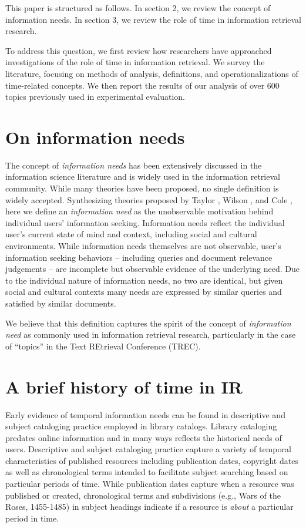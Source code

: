 \documentclass{sig-alternate}
\begin{document}
This paper is structured as follows.  In section 2, we review the concept of information needs. In section 3, we review the role of time in information retrieval research. 


To address this question, we first review how researchers have approached investigations of the role of time in information retrieval. We survey the literature, focusing on methods of analysis, definitions, and operationalizations of time-related concepts. We then report the results of our analysis of over 600 topics previously used in experimental evaluation. 


\section{On information needs}

The concept of \emph{information needs} has been extensively discussed in the information science literature and is widely used in the information retrieval community. While many theories have been proposed, no single definition is widely accepted.  Synthesizing theories proposed by Taylor \cite{Taylor}, Wilson \cite{Wilson}, and Cole \cite{Cole}, here we define an \emph{information need} as the unobservable motivation behind individual users' information seeking. Information needs reflect the individual user's current state of mind and context, including social and cultural environments. While information needs themselves are not observable, user's information seeking behaviors -- including queries and document relevance judgements -- are incomplete but observable evidence of the underlying need. Due to the individual nature of information needs, no two are identical, but given social and cultural contexts many needs are expressed by similar queries and satisfied by similar documents. 

We believe that this definition captures the spirit of the concept of \emph{information need} as commonly used in information retrieval research, particularly in the case of ``topics'' in the Text REtrieval Conference (TREC).

\section{A brief history of time in IR}

Early evidence of temporal information needs can be found in descriptive and subject cataloging practice employed in library catalogs. Library cataloging predates online information and in many ways reflects the historical needs of users. Descriptive and subject cataloging practice capture a variety of temporal characteristics of published resources including publication dates, copyright dates as well as chronological terms intended to facilitate subject searching based on particular periods of time. While publication dates capture when a resource was published or created, chronological terms and subdivisions (e.g., Wars of the Roses, 1455-1485) in subject headings indicate if a resource is \emph{about} a particular period in time. 
\end{document}
